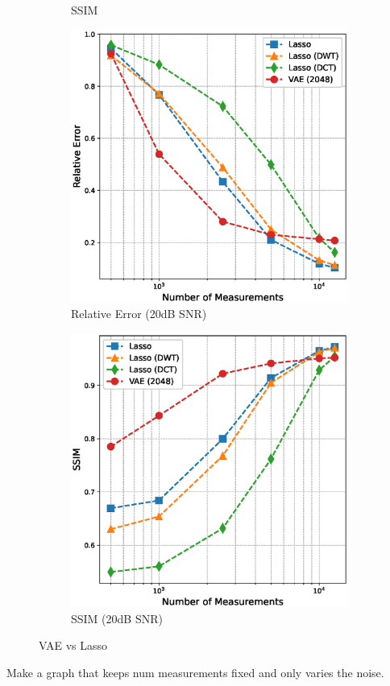 \begin{figure}[h!]
\begin{subfigure}[b]{0.49\textwidth}
        \caption{SSIM}
    \end{subfigure}
    \begin{subfigure}[b]{0.49\textwidth}
        \includegraphics[width=\textwidth]{figures/06_results/vae_benchmark/vae_vs_lasso/vae_vs_lasso_relative_error_noisy.eps}
        \caption{Relative Error (20dB SNR)}
    \end{subfigure}
    \begin{subfigure}[b]{0.49\textwidth}
        \includegraphics[width=\textwidth]{figures/06_results/vae_benchmark/vae_vs_lasso/vae_vs_lasso_ssim_noisy.eps}
        \caption{SSIM (20dB SNR)}
    \end{subfigure}
    \caption{VAE vs Lasso}
\end{figure}
Make a graph that keeps num measurements fixed and only varies the noise.


